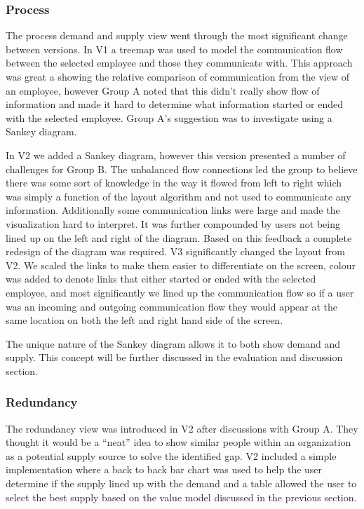 \documentclass[journal]{vgtc}                %
\begin{document}
\subsubsection{Process}

The process demand and supply view went through the most significant change between versions.  In V1 a treemap was used to model the communication flow between the selected employee and those they communicate with.  This approach was great a showing the relative comparison of communication from the view of an employee, however Group A noted that this didn't really show flow of information and made it hard to determine what information started or ended with the selected employee.  Group A's suggestion was to investigate using a Sankey diagram.

In V2 we added a Sankey diagram, however this version presented a number of challenges for Group B.  The unbalanced flow connections led the group to believe there was some sort of knowledge in the way it flowed from left to right which was simply a function of the layout algorithm and not used to communicate any information.  Additionally some communication links were large and made the visualization hard to interpret.  It was further compounded by users not being lined up on the left and right of the diagram.  Based on this feedback a complete redesign of the diagram was required.
V3 significantly changed the layout from V2.  We scaled the links to make them easier to differentiate on the screen, colour was added to denote links that either started or ended with the selected employee, and most significantly we lined up the communication flow so if a user was an incoming and outgoing communication flow they would appear at the same location on both the left and right hand side of the screen.

The unique nature of the Sankey diagram allows it to both show demand and supply.  This concept will be further discussed in the evaluation and discussion section.

\subsubsection{Redundancy}

The redundancy view was introduced in V2 after discussions with Group A.  They thought it would be a ``neat'' idea to show similar people within an organization as a potential supply source to solve the identified gap.  V2 included a simple implementation where a back to back bar chart was used to help the user determine if the supply lined up with the demand and a table allowed the user to select the best supply based on the value model discussed in the previous section.
\end{document}
